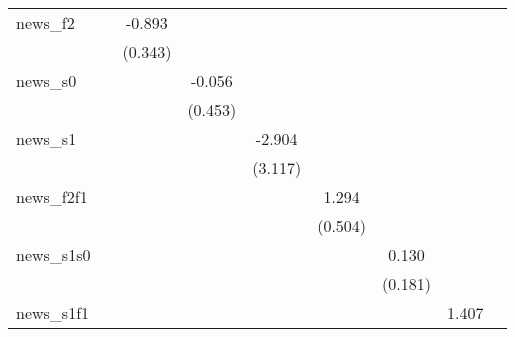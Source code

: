 {\begin{tabular}{l*{8}{c}}
\addlinespace
news\_f2     &                     &      -0.893\sym{***}&                     &                     &                     &                     &                     &                     \\
            &                     &     (0.343)         &                     &                     &                     &                     &                     &                     \\
\addlinespace
news\_s0     &                     &                     &      -0.056         &                     &                     &                     &                     &                     \\
            &                     &                     &     (0.453)         &                     &                     &                     &                     &                     \\
\addlinespace
news\_s1     &                     &                     &                     &      -2.904         &                     &                     &                     &                     \\
            &                     &                     &                     &     (3.117)         &                     &                     &                     &                     \\
\addlinespace
news\_f2f1   &                     &                     &                     &                     &       1.294\sym{**} &                     &                     &                     \\
            &                     &                     &                     &                     &     (0.504)         &                     &                     &                     \\
\addlinespace
news\_s1s0   &                     &                     &                     &                     &                     &       0.130         &                     &                     \\
            &                     &                     &                     &                     &                     &     (0.181)         &                     &                     \\
\addlinespace
news\_s1f1   &                     &                     &                     &                     &                     &                     &       1.407         &                     \\

\end{tabular}}
